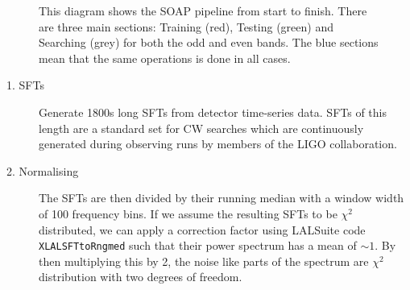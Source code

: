%
\begin{figure}[htp]
	\centering
	\scalebox{0.7}{
		}
	\caption[Flow diagram for entire SOAP and \gls{CNN} search.]{\label{machine:pipeline:flow} This diagram shows the SOAP pipeline from start to finish. There are three main sections: Training (red), Testing (green) and Searching (grey) for both the odd and even bands. The blue sections mean that the same operations is done in all cases.}
	
\end{figure}

%
\begin{description}
	\item[1. SFTs] Generate 1800s long \glspl{SFT} from detector time-series
	data. \glspl{SFT} of this length are a standard set for \gls{CW} searches which are continuously generated during observing runs by members of the \gls{LIGO} collaboration. 
	\item[2. Normalising] The \glspl{SFT} are then divided by their running median with a window width of 100 frequency bins.
	If we assume the resulting \glspl{SFT} to be $\chi^2$ distributed, we can apply a correction factor using LALSuite code {\tt XLALSFTtoRngmed} \cite{ligoscientificcollaboration2018LIGOAlgorithm} such that their power spectrum has a mean of $\sim 1$. 
	By then multiplying this by 2, the noise like parts of the spectrum are $\chi^2$ distribution with two degrees of freedom.
	

\end{description}
